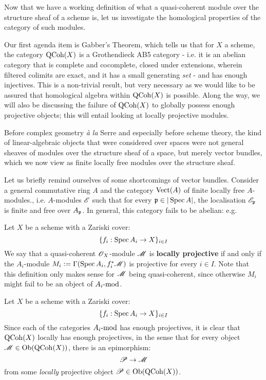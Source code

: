             Now that we have a working definition of what a quasi-coherent module over the structure sheaf of a scheme is, let us investigate the homological properties of the category of such modules. 

            Our first agenda item is Gabber's Theorem, which tells us that for $X$ a scheme, the category $\QCoh(X)$ is a Grothendieck AB5 category - i.e. it is an abelian category that is complete and cocomplete, closed under extensions, wherein filtered colimits are exact, and it has a small generating \textit{set} - and has enough injectives. This is a non-trivial result, but very necessary as we would like to be assured that homological algebra within $\QCoh(X)$ is possible. Along the way, we will also be discussing the failure of $\QCoh(X)$ to globally possess enough projective objects; this will entail looking at locally projective modules. 
            \begin{remark}
                Before complex geometry \textit{\`a la} Serre and especially before scheme theory, the kind of linear-algebraic objects that were considered over spaces were not general sheaves of modules over the structure sheaf of a space, but merely vector bundles, which we now view as finite locally free modules over the structure sheaf. 

                Let us briefly remind ourselves of some shortcomings of vector bundles. Consider a general commutative ring $A$ and the category $\Vect(A)$ of finite locally free $A$-modules., i.e. $A$-modules $\scrE$ such that for every $\p \in |\Spec A|$, the localisation $\scrE_{\p}$ is finite and free over $A_{\p}$. In general, this category fails to be abelian: e.g. 
            \end{remark}

            \begin{definition} \label{def: locally_projective_modules}
                Let $X$ be a scheme with a Zariski cover:
                    $$\{f_i: \Spec A_i \to X\}_{i \in I}$$
                We say that a quasi-coherent $\scrO_X$-module $\scrM$ is \textbf{locally projective} if and only if the $A_i$-module $M_i := \Gamma(\Spec A_i, f_i^*\scrM)$ is projective for every $i \in I$. Note that this definition only makes sense for $\scrM$ being quasi-coherent, since otherwise $M_i$ might fail to be an object of $A_i\mod$.
            \end{definition}
            \begin{remark}
                Let $X$ be a scheme with a Zariski cover:
                    $$\{f_i: \Spec A_i \to X\}_{i \in I}$$
                Since each of the categories $A_i\mod$ has enough projectives, it is clear that $\QCoh(X)$ locally has enough projectives, in the sense that for every object $\scrM \in \Ob( \QCoh(X) )$, there is an epimorphism:
                    $$\scrP \to \scrM$$
                from some \textit{locally} projective object $\scrP \in \Ob( \QCoh(X) )$. 
            \end{remark}
            
